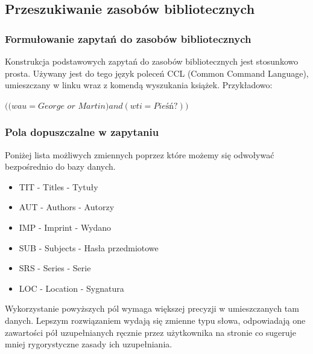 \documentclass{report}
\begin{document}
	

		\subsection{Przeszukiwanie zasobów bibliotecznych}
		
			\subsubsection{Formułowanie zapytań do zasobów bibliotecznych}
		
				Konstrukcja podstawowych zapytań do zasobów bibliotecznych jest stosunkowo prosta. Używany jest do tego język poleceń CCL (Common Command Language), umieszczany w linku wraz z komendą wyszukania książek. Przykładowo:
				
				\begin{center}
					$ ((wau=George$ $or$ $Martin) and (wti=Pieśń?)) $\\
				\end{center}

			\subsubsection{Pola dopuszczalne w zapytaniu}
			
				Poniżej lista możliwych zmiennych poprzez które możemy się odwoływać bezpośrednio do bazy danych.
				
				\begin{itemize}
					\item TIT - Titles - Tytuły
					\item AUT - Authors - Autorzy
					\item IMP - Imprint - Wydano
					\item SUB - Subjects - Hasła przedmiotowe
					\item SRS - Series - Serie
					\item LOC - Location - Sygnatura
				\end{itemize}
				
				Wykorzystanie powyższych pól wymaga większej precyzji w umieszczanych tam danych. Lepszym rozwiązaniem wydają się zmienne typu słowa, odpowiadają one zawartości pół uzupełnianych ręcznie przez użytkownika na stronie co sugeruje mniej rygorystyczne zasady ich uzupełniania.
				
\end{document}
